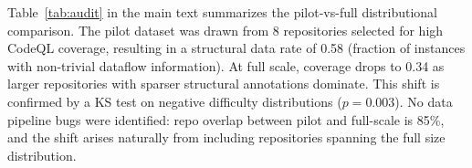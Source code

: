 \documentclass[11pt,a4paper]{article}
\begin{document}
Table~\ref{tab:audit} in the main text summarizes the pilot-vs-full distributional comparison.
The pilot dataset was drawn from 8 repositories selected for high CodeQL coverage, resulting in a structural data rate of 0.58 (fraction of instances with non-trivial dataflow information).
At full scale, coverage drops to 0.34 as larger repositories with sparser structural annotations dominate.
This shift is confirmed by a KS test on negative difficulty distributions ($p = 0.003$).
No data pipeline bugs were identified: repo overlap between pilot and full-scale is 85\%, and the shift arises naturally from including repositories spanning the full size distribution.
\end{document}
